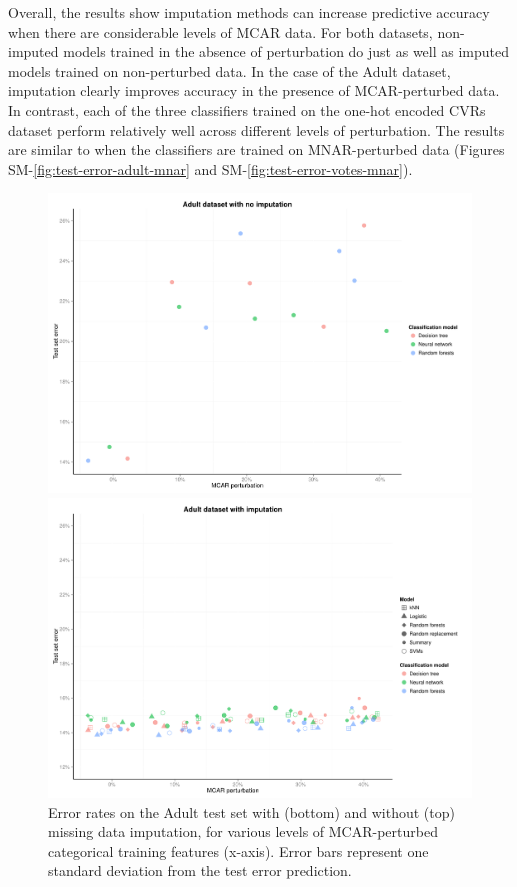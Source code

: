 \documentclass[10pt]{book}
\theoremstyle{definition}
\begin{document}
Overall, the results show imputation methods can increase predictive accuracy when there are considerable levels of MCAR data. For both datasets, non-imputed models trained in the absence of perturbation do just as well as imputed models trained on non-perturbed data. In the case of the Adult dataset, imputation clearly improves accuracy in the presence of MCAR-perturbed data. In contrast, each of the three classifiers trained on the one-hot encoded CVRs dataset perform relatively well across different levels of perturbation. The results are similar to when the classifiers are trained on MNAR-perturbed data (Figures SM-\ref{fig:test-error-adult-mnar} and SM-\ref{fig:test-error-votes-mnar}).

\begin{figure}[h!]
\includegraphics[scale=0.58, center]{figure/test-errors-adult-no-imp-mcar}\par
\includegraphics[scale=0.58, center]{figure/test-errors-adult-imp-mcar}\par
   \caption{\footnotesize Error rates on the Adult test set with (bottom) and without (top) missing data imputation, for various levels of MCAR-perturbed categorical training features (x-axis). Error bars represent one standard deviation from the test error prediction.}
   \label{fig:test-error-adult}
\end{figure}
\end{document}
